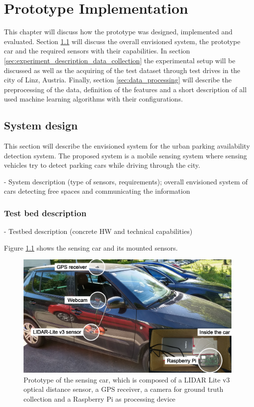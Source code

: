 \chapter{Prototype Implementation}
\label{chap:referenceimplementation}

This chapter will discuss how the prototype was designed, implemented and evaluated. Section \ref{sec:system_design} will discuss the overall envisioned system, the prototype car and the required sensors with their capabilities. In section \ref{sec:experiment_description_data_collection} the experimental setup will be discussed as well as the acquiring of the test dataset through test drives in the city of Linz, Austria. Finally, section \ref{sec:data_processing} will describe the preprocessing of the data, definition of the features and a short description of all used machine learning algorithms with their configurations. 

\section{System design}
\label{sec:system_design}

This section will describe the envisioned system for the urban parking availability detection system. The proposed system is a mobile sensing system where sensing vehicles try to detect parking cars while driving through the city. 

- System description (type of sensors, requirements); overall envisioned system of cars detecting free spaces and communicating the information

\subsection{Test bed description}
\label{sec:test_bed}

- Testbed description (concrete HW and technical capabilities)

Figure \ref{fig:sensing_car} shows the sensing car and its mounted sensors. 

\begin{figure}
	\centering
	\includegraphics[width=\textwidth]{img/car.jpg}
	\caption{Prototype of the sensing car, which is composed of a LIDAR Lite v3 optical distance sensor, a GPS receiver, a camera for ground truth collection and a Raspberry Pi as processing device}
	\label{fig:sensing_car}
\end{figure}


